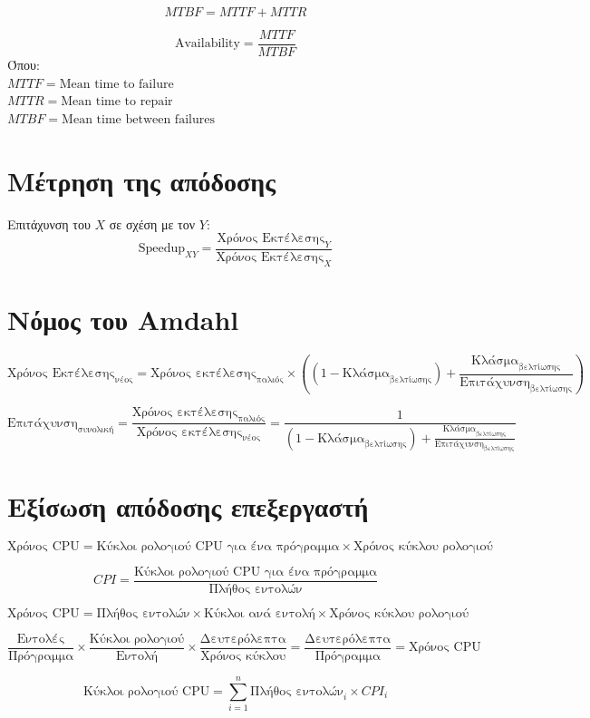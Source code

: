\documentclass[11pt, oneside]{article}   	%
\begin{document}
\[MTBF = MTTF + MTTR\]

\[\text{Availability} = \frac{MTTF}{MTBF}\]
Όπου: \\
$MTTF = \text{Mean time to failure}$\\
$MTTR = \text{Mean time to repair}$\\
$MTBF = \text{Mean time between failures}$

\section{Μέτρηση της απόδοσης}

Επιτάχυνση του $X$ σε σχέση με τον $Y$:\\

\[\text{Speedup}_{XY} = \frac{\text{Χρόνος Εκτέλεσης}_Y}{\text{Χρόνος Εκτέλεσης}_X}\]

\section{Νόμος του Amdahl}

\[\text{Χρόνος Εκτέλεσης}_{\text{νέος}} = \text{Χρόνος εκτέλεσης}_{\text{παλιός}} \times \left((1-\text{Κλάσμα}_{\text{βελτίωσης}}) + \frac{\text{Κλάσμα}_{\text{βελτίωσης}}}{\text{Επιτάχυνση}_{\text{βελτίωσης}}}\right)\]

\[\text{Επιτάχυνση}_{\text{συνολική}} = \frac{\text{Χρόνος εκτέλεσης}_{\text{παλιός}}}{\text{Χρόνος εκτέλεσης}_{\text{νέος}}} = \frac{1}{(1-\text{Κλάσμα}_{\text{βελτίωσης}})+\frac{\text{Κλάσμα}_{\text{βελτίωσης}}}{\text{Επιτάχυνση}_{\text{βελτίωσης}}}}\]

\section{Εξίσωση απόδοσης επεξεργαστή}

\[\text{Χρόνος CPU} = \text{Κύκλοι ρολογιού CPU για ένα πρόγραμμα} \times \text{Χρόνος κύκλου 	ρολογιού}\]

\[ CPI = \frac{\text{Κύκλοι ρολογιού CPU για ένα πρόγραμμα}}{\text{Πλήθος εντολών}}\]

\[\text{Χρόνος CPU} = \text{Πλήθος εντολών} \times \text{Κύκλοι ανά εντολή} \times \text{Χρόνος κύκλου ρολογιού}\]

\[\frac{\text{Εντολές}}{\text{Πρόγραμμα}} \times \frac{\text{Κύκλοι ρολογιού}}{\text{Εντολή}} \times \frac{\text{Δευτερόλεπτα}}{\text{Χρόνος κύκλου}} =
 \frac{\text{Δευτερόλεπτα}}{\text{Πρόγραμμα}} = \text{Χρόνος CPU}\]

\[\text{Κύκλοι ρολογιού CPU} = \sum_{i=1}^n \text{Πλήθος εντολών}_i \times CPI_i\]
\end{document}
